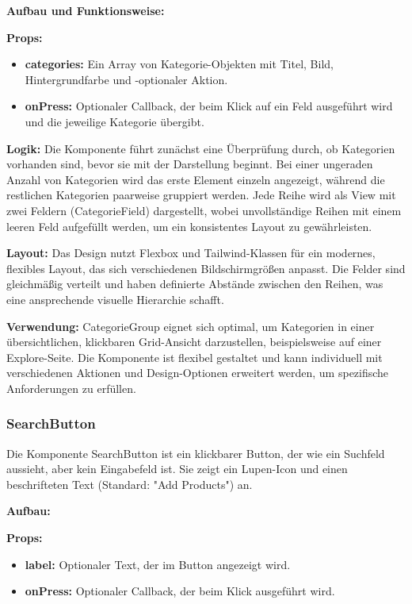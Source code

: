 \noindent\textbf{Aufbau und Funktionsweise:}

\textbf{Props:}
\begin{itemize}
    \item \textbf{categories:} Ein Array von Kategorie-Objekten mit Titel, Bild, Hintergrundfarbe und -optionaler Aktion.
    \item \textbf{onPress:} Optionaler Callback, der beim Klick auf ein Feld ausgeführt wird und die jeweilige Kategorie übergibt.
\end{itemize}

\textbf{Logik:}
Die Komponente führt zunächst eine Überprüfung durch, ob Kategorien vorhanden sind, bevor sie mit der Darstellung beginnt. Bei einer ungeraden Anzahl von Kategorien wird das erste Element einzeln angezeigt, während die restlichen Kategorien paarweise gruppiert werden. Jede Reihe wird als View mit zwei Feldern (CategorieField) dargestellt, wobei unvollständige Reihen mit einem leeren Feld aufgefüllt werden, um ein konsistentes Layout zu gewährleisten.

\textbf{Layout:}
Das Design nutzt Flexbox und Tailwind-Klassen für ein modernes, flexibles Layout, das sich verschiedenen Bildschirmgrößen anpasst. Die Felder sind gleichmäßig verteilt und haben definierte Abstände zwischen den Reihen, was eine ansprechende visuelle Hierarchie schafft.

\noindent\textbf{Verwendung:} CategorieGroup eignet sich optimal, um Kategorien in einer übersichtlichen, klickbaren Grid-Ansicht darzustellen, beispielsweise auf einer Explore-Seite. Die Komponente ist flexibel gestaltet und kann individuell mit verschiedenen Aktionen und Design-Optionen erweitert werden, um spezifische Anforderungen zu erfüllen.

\subsubsection{SearchButton}
Die Komponente SearchButton ist ein klickbarer Button, der wie ein Suchfeld aussieht, aber kein Eingabefeld ist. Sie zeigt ein Lupen-Icon und einen beschrifteten Text (Standard: "Add Products") an.

\noindent\textbf{Aufbau:}

\textbf{Props:}
\begin{itemize}
    \item \textbf{label:} Optionaler Text, der im Button angezeigt wird.
    \item \textbf{onPress:} Optionaler Callback, der beim Klick ausgeführt wird.
\end{itemize}

